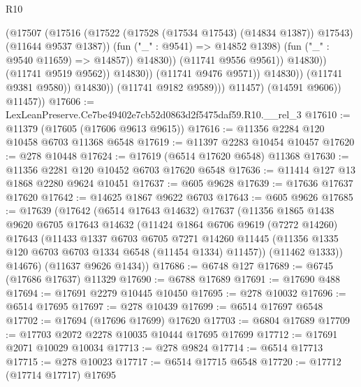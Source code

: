 \begin{lexlean}{R10}
\begin{coremodule}
                                            (@17507
                                              (@17516
                                                (@17522
                                                  (@17528 (@17534 @17543) (@14834 @1387))
                                                  @17543)
                                                (@11644 @9537 @1387))
                                              (fun ("_" : @9541) => @14852 @1398)
                                              (fun ("_" : @9540 @11659) => @14857))
                                            @14830))
                                        (@11741 @9556 @9561))
                                      @14830))
                                  (@11741 @9519 @9562))
                                @14830))
                            (@11741 @9476 @9571))
                          @14830))
                      (@11741 @9381 @9580))
                    @14830))
                (@11741 @9182 @9589)))
            @11457)
          (@14591 @9606))
        @11457))
@17606 := LexLeanPreserve.Ce7be49402e7cb52d0863d2f5475daf59.R10.__rel_3
@17610 := @11379 (@17605 (@17606 @9613 @9615))
@17616 := @11356 @2284 @120 @10458 @6703 @11368 @6548
@17619 := @11397 @2283 @10454 @10457
@17620 := @278 @10448
@17624 := @17619 (@6514 @17620 @6548) @11368
@17630 := @11356 @2281 @120 @10452 @6703 @17620 @6548
@17636 := @11414 @127 @13 @1868 @2280 @9624 @10451
@17637 := @605 @9628
@17639 := @17636 @17637 @17620
@17642 := @14625 @1867 @9622 @6703
@17643 := @605 @9626
@17685 := @17639
    (@17642
      (@6514 @17643 @14632)
      @17637
      (@11356
        @1865
        @1438
        @9620
        @6705
        @17643
        @14632
        (@11424
          @1864
          @6706
          @9619
          (@7272 @14260)
          @17643
          (@11433
            @1337
            @6703
            @6705
            @7271
            @14260
            @11445
            (@11356 @1335 @120 @6703 @6703 @1334 @6548 (@11454 @1334) @11457))
          (@11462 @1333))
        @14676)
      (@11637 @9626 @1434))
@17686 := @6748 @127
@17689 := @6745 (@17686 @17637) @11329
@17690 := @6788 @17689
@17691 := @17690 @488
@17694 := @17691 @2279 @10445 @10450
@17695 := @278 @10032
@17696 := @6514 @17695
@17697 := @278 @10439
@17699 := @6514 @17697 @6548
@17702 := @17694 (@17696 @17699) @17620
@17703 := @6804 @17689
@17709 := @17703 @2072 @2278 @10035 @10444 @17695 @17699
@17712 := @17691 @2071 @10029 @10034
@17713 := @278 @9824
@17714 := @6514 @17713
@17715 := @278 @10023
@17717 := @6514 @17715 @6548
@17720 := @17712 (@17714 @17717) @17695

\end{coremodule}
\end{lexlean}
